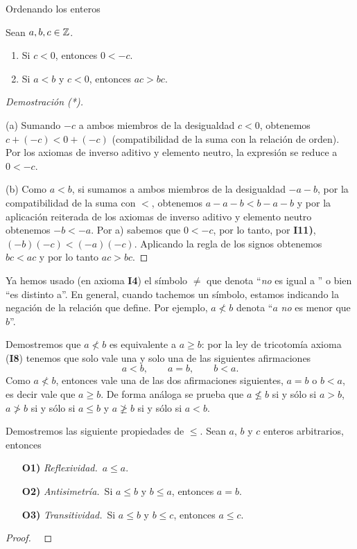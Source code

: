 \begin{section}{Ordenando los enteros}
\begin{proposicion}\label{prop-compatibilidad-negativa}
    Sean $a, b, c \in {\mathbb Z}$.  
    \begin{enumerate}[label=(\alph*)]
        \item Si $c < 0$, entonces $0 < -c$.
        \item Si $a< b$ y $c< 0$, entonces $ac > bc$. 
    \end{enumerate}
\end{proposicion}
\begin{proof}[Demostración (*)] {${}^{}$}
    
    (a) Sumando $-c$ a ambos miembros de la desigualdad $c < 0$, obtenemos $c + (-c) < 0 + (-c)$ (compatibilidad de la suma con la relación de orden). Por los axiomas de inverso aditivo y elemento neutro, la expresión se reduce a $0 < -c$.
    
    (b) Como $a < b$, si sumamos a ambos miembros de la desigualdad $-a -b$, por la compatibilidad  de la suma con $<$, obtenemos $a -a -b < b -a -b$ y por la aplicación reiterada de los axiomas de inverso aditivo y elemento neutro  obtenemos $-b < -a$. Por a) sabemos que $0< -c$, por lo tanto, por \textbf{I11)}, $(-b)(-c) < (-a)(-c)$. Aplicando la regla de los signos obtenemos $bc < ac$ y por lo tanto $ac > bc$.

\end{proof}

Ya hemos usado (en axioma \textbf{I4}) el símbolo $\not=$ que denota  ``{\em no} es igual a '' o bien ``es distinto a''.   En  general, cuando tachemos un símbolo, estamos indicando la negación de la relación que define. Por ejemplo, $a\not< b$ denota ``$a$ {\em no} es menor que $b$''. 

\begin{observacion*} Demostremos que  $a\not< b$ es equivalente a $a\ge b$: por la ley de tricotomía axioma (\textbf{I8}) tenemos que solo vale una y solo una de las siguientes afirmaciones
$$
a<b, \qquad a = b, \qquad b < a.
$$
Como  $a\not< b$, entonces vale una de las dos afirmaciones siguientes, $a=b$ o $b<a$, es decir  vale que $a \ge b$. De forma análoga se prueba que $a\not\le b$ si  y sólo si $a>b$, $a\not> b$ si  y sólo si $a \le b$ y $a\not\ge b$ si  y sólo si $a<b$.

\end{observacion*}


\begin{ejemplo}\label{relaciondeorden}
Demostremos las siguiente propiedades de $\le$. Sean  $a$, $b$ y $c$  enteros arbitrarios,  entonces
\begin{enumerate}
\item[\textbf{O1)}] {\em Reflexividad.}\, $a \le a$.
\item[\textbf{O2)}] {\em Antisimetría.}\, Si $a \le b$ y $b \le a$, entonces $a=b$.
\item[\textbf{O3)}] {\em Transitividad.}\, Si $a\le b$ y $b\le c$, entonces $a \le c$.
\end{enumerate}
\begin{proof}
\
    

\end{proof}
\end{ejemplo}
\end{section}
